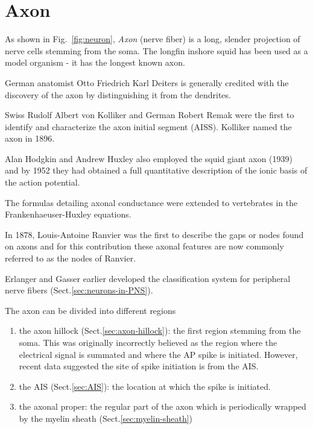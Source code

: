 \section{Axon}
\label{sec:Axon}

As shown in Fig.~\ref{fig:neuron}, {\it Axon} (nerve fiber) is a long, slender
projection of nerve cells stemming from the soma.
The longfin inshore squid has been used as a model organism - it has the longest
known axon.

\begin{mdframed}
 German anatomist Otto Friedrich Karl Deiters is generally credited with the
 discovery of the axon by distinguishing it from the dendrites.
 
 Swiss Rudolf Albert von Kolliker and German Robert Remak were the first to
 identify and characterize the axon initial segment (AISS). Kolliker named the
 axon in 1896.
 
 Alan Hodgkin and Andrew Huxley also employed the squid giant axon (1939) and by
 1952 they had obtained a full quantitative description of the ionic basis of
 the action potential.
 
 The formulas detailing axonal conductance were extended to vertebrates in the
 Frankenhaeuser-Huxley equations.
 
 In 1878, Louis-Antoine Ranvier was the first to describe the gaps or nodes
 found on axons and for this contribution these axonal features are now commonly
 referred to as the nodes of Ranvier.
 
 Erlanger and Gasser earlier developed the classification system for peripheral
 nerve fibers (Sect.\ref{sec:neurons-in-PNS}).
\end{mdframed}

The axon can be divided into different regions
\begin{enumerate}
  \item the axon hillock (Sect.\ref{sec:axon-hillock}): the first region
  stemming from the soma. This was originally incorrectly believed as the region
  where the electrical signal is summated and where the AP spike is initiated. 
  However, recent data suggested the site of spike initiation is from the AIS.
  
  \item the AIS (Sect.\ref{sec:AIS}): the location at which the spike is
  initiated.
  
  \item the axonal proper: the regular part of the axon which is periodically
  wrapped by the myelin sheath (Sect.\ref{sec:myelin-sheath})
\end{enumerate}

